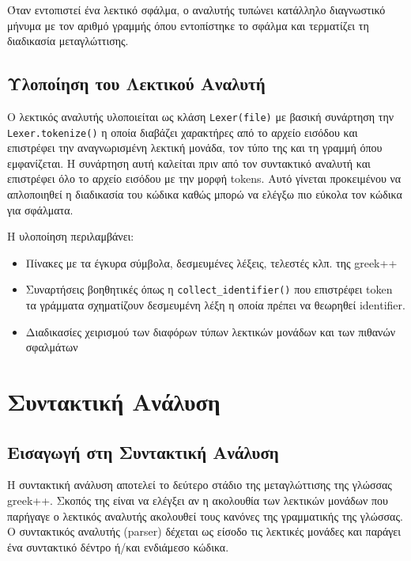 \documentclass[12pt,a4paper]{article}
\begin{document}
        Όταν εντοπιστεί ένα λεκτικό σφάλμα, ο αναλυτής τυπώνει κατάλληλο διαγνωστικό μήνυμα με τον αριθμό γραμμής όπου εντοπίστηκε το σφάλμα και τερματίζει τη διαδικασία μεταγλώττισης.

        \subsection{Υλοποίηση του Λεκτικού Αναλυτή}
        Ο λεκτικός αναλυτής υλοποιείται ως κλάση \texttt{Lexer(file)} με βασική συνάρτηση την \texttt{Lexer.tokenize()} η οποία διαβάζει χαρακτήρες από το αρχείο εισόδου και επιστρέφει την αναγνωρισμένη λεκτική μονάδα, τον τύπο της και τη γραμμή όπου εμφανίζεται. Η συνάρτηση αυτή καλείται πριν από τον συντακτικό αναλυτή και επιστρέφει όλο το αρχείο εισόδου με την μορφή tokens. Αυτό γίνεται προκειμένου να απλοποιηθεί η διαδικασία του κώδικα καθώς μπορώ να ελέγξω πιο εύκολα τον κώδικα για σφάλματα.

        Η υλοποίηση περιλαμβάνει:
        \begin{itemize}
            \item Πίνακες με τα έγκυρα σύμβολα, δεσμευμένες λέξεις, τελεστές κλπ. της greek++
            \item Συναρτήσεις βοηθητικές όπως η \texttt{collect\_identifier()} που επιστρέφει token  τα γράμματα σχηματίζουν δεσμευμένη λέξη η οποία πρέπει να θεωρηθεί identifier.
            \item Διαδικασίες χειρισμού των διαφόρων τύπων λεκτικών μονάδων και των πιθανών σφαλμάτων
        \end{itemize}




    \section{Συντακτική Ανάλυση}

        \subsection{Εισαγωγή στη Συντακτική Ανάλυση}
            Η συντακτική ανάλυση αποτελεί το δεύτερο στάδιο της μεταγλώττισης της γλώσσας greek++. Σκοπός της είναι να ελέγξει αν η ακολουθία των λεκτικών μονάδων που παρήγαγε ο λεκτικός αναλυτής ακολουθεί τους κανόνες της γραμματικής της γλώσσας. Ο συντακτικός αναλυτής (parser) δέχεται ως είσοδο τις λεκτικές μονάδες και παράγει ένα συντακτικό δέντρο ή/και ενδιάμεσο κώδικα.
\end{document}
